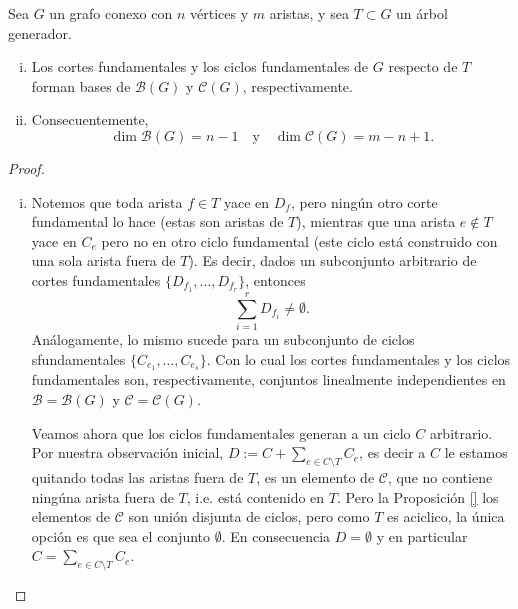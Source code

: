 \documentclass[../main.tex]{subfiles}
\begin{document}
\begin{theorem}
Sea $G$ un grafo conexo con $n$ vértices y $m$ aristas, y sea $T \subset G$ un árbol generador.
\begin{enumerate}[(i)]
\item Los cortes fundamentales y los ciclos fundamentales de $G$ respecto de $T$ forman bases de $\mathcal{B}(G)$ y $\mathcal{C}(G)$, respectivamente.
\item Consecuentemente,
$$
\dim \mathcal{B}(G) = n-1 \quad \text{y} \quad \dim \mathcal{C}(G) = m - n + 1.
$$
\end{enumerate}
\end{theorem}
\begin{proof}
\begin{enumerate}[(i)]
\item Notemos que toda arista $f \in T$ yace en $D_f$, pero ningún otro corte fundamental lo hace (estas son aristas de $T$), mientras que una arista $e \not \in T$ yace en $C_e$ pero no en otro ciclo fundamental (este ciclo está construido con una sola arista fuera de $T$).
Es decir, dados un subconjunto arbitrario de cortes fundamentales $\{ D_{f_1}, \ldots, D_{f_r}\}$, entonces
$$
\sum_{i = 1}^r D_{f_i} \neq \emptyset.
$$
Análogamente, lo mismo sucede para un subconjunto de ciclos sfundamentales $\{ C_{e_1}, \ldots, C_{e_s} \}$.
Con lo cual los cortes fundamentales y los ciclos fundamentales son, respectivamente, conjuntos linealmente independientes en $\mathcal B = \mathcal B (G)$ y $\mathcal C  = \mathcal C (G)$.

Veamos ahora que los ciclos fundamentales generan a un ciclo $C$ arbitrario. Por nuestra observación inicial, $D := C + \sum_{e \in C \setminus T} C_e$, es decir a $C$ le estamos quitando todas las aristas fuera de $T$, es un elemento de $\mathcal C$, que no contiene ningúna arista fuera de $T$, i.e. está contenido en $T$. Pero la Proposición \ref{} los elementos de $\mathcal C$ son unión disjunta de ciclos, pero como $T$ es aciclico, la única opción es que sea el conjunto $\emptyset$. En consecuencia $D = \emptyset$ y en particular $C = \sum_{e \in C \setminus T} C_e$.


\end{enumerate}
\end{proof}
\end{document}
